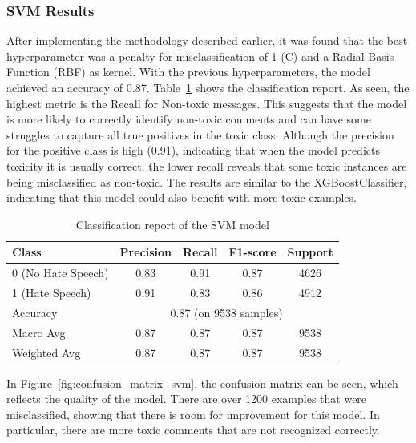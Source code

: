 \subsubsection{SVM Results}
After implementing the methodology described earlier, it was found that the best hyperparameter was a penalty for misclassification of 1 (C) and a Radial Basis Function (RBF) as kernel. With the previous hyperparameters, the model achieved an accuracy of 0.87. 
Table~\ref{tab:gru_classification_report} shows the classification report. As seen, the highest metric is the Recall for Non-toxic messages. This suggests that the model is more likely to correctly identify non-toxic comments and can have some struggles to capture all true positives in the toxic class. Although the precision for the positive class is high (0.91), indicating that when the model predicts toxicity it is usually correct, the lower recall reveals that some toxic instances are being misclassified as non-toxic. The results are similar to the XGBoostClassifier, indicating that this model could also benefit with more toxic examples.

\begin{table}[H]
    \centering
    \caption{Classification report of the SVM model}
    \label{tab:gru_classification_report}
    \begin{tabular}{lcccc}
        \toprule
        Class & Precision & Recall & F1-score & Support \\
        \midrule
        0 (No Hate Speech) & 0.83 & 0.91 & 0.87 & 4626 \\
        1 (Hate Speech)    & 0.91 & 0.83 & 0.86 & 4912 \\
        \midrule
        Accuracy           & \multicolumn{4}{c}{0.87 (on 9538 samples)} \\
        Macro Avg          & 0.87 & 0.87 & 0.87 & 9538 \\
        Weighted Avg       & 0.87 & 0.87 & 0.87 & 9538 \\
        \bottomrule
    \end{tabular}
\end{table}

In Figure~\ref{fig:confusion_matrix_svm}, the confusion matrix can be seen, which reflects the quality of the model. There are over 1200 examples that were misclassified, showing that there is room for improvement for this model. In particular, there are more toxic comments that are not recognized correctly.

